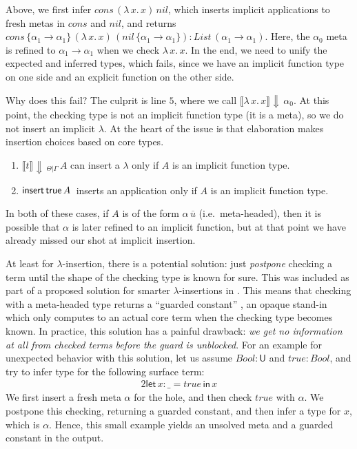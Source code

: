 \documentclass[acmsmall,review,anonymous,prologue,dvipsnames]{acmart}\settopmatter{printfolios=true,printccs=false,printacmref=false}
\newcommand{\slet}{\boldsymbol{\mathsf{let}}}
\renewcommand{\sin}{\boldsymbol{\mathsf{in}}}
\renewcommand{\U}{\mathsf{U}}
\newcommand{\echeck}[4]{\llbracket#1\rrbracket\!\Downarrow\,_{#2|#3}\,#4}
\newcommand{\echeckt}[2]{\llbracket#1\rrbracket\!\Downarrow\,#2}
\newcommand{\true}{\mathsf{true}}
\newcommand{\einsert}[3]{\mathsf{insert}\,#1\,#2\,#3}
\theoremstyle{remark}
\begin{document}
Above, we first infer $cons\,(\lambda\,x.\,x)\,nil$, which inserts implicit
applications to fresh metas in $cons$ and $nil$, and returns $cons\,\{\alpha_1
\to \alpha_1\}\,(\lambda\,x.\,x)\,(nil\,\{\alpha_1\to\alpha_1\}) :
List\,(\alpha_1\to\alpha_1)$. Here, the $\alpha_0$ meta is refined to $\alpha_1
\to \alpha_1$ when we check $\lambda\,x.\,x$. In the end, we need to unify the
expected and inferred types, which fails, since we have an implicit function
type on one side and an explicit function on the other side.

Why does this fail? The culprit is line $\scriptstyle{5}$, where we call
$\echeckt{\lambda\,x.\,x}{\alpha_0}$. At this point, the checking type is not an
implicit function type (it is a meta), so we do not insert an implicit
$\lambda$. At the heart of the issue is that elaboration makes insertion choices
based on core types.
\begin{enumerate}
\item $\echeck{t}{\Theta}{\Gamma}{A}$ can insert a $\lambda$ only if $A$ is an implicit function type.
\item $\einsert{\true}{A}$ inserts an application only if $A$ is an implicit function type.
\end{enumerate}
In both of these cases, if $A$ is of the form $\alpha\,\overline{u}$
(i.e.\ meta-headed), then it is possible that $\alpha$ is later refined to an
implicit function, but at that point we have already missed our shot at implicit
insertion.

At least for $\lambda$-insertion, there is a potential solution: just
\emph{postpone} checking a term until the shape of the checking type is known
for sure. This was included as part of a proposed solution for smarter
$\lambda$-insertions in \cite{johansson2015eliminating}. This means that
checking with a meta-headed type returns a ``guarded constant''
\cite[Chapter~3]{norell07thesis}, an opaque stand-in which only computes to an
actual core term when the checking type becomes known. In practice, this
solution has a painful drawback: \emph{we get no information at all from checked
  terms before the guard is unblocked}. For an example for unexpected behavior
with this solution, let us assume $Bool : \U$ and $true : Bool$, and try to
infer type for the following surface term:
\begin{alignat*}{2}
  \slet\,x : \_ = true\,\sin\, x
\end{alignat*}
We first insert a fresh meta $\alpha$ for the hole, and then check $true$ with
$\alpha$. We postpone this checking, returning a guarded constant, and then
infer a type for $x$, which is $\alpha$. Hence, this small example yields an
unsolved meta and a guarded constant in the output.
\end{document}
